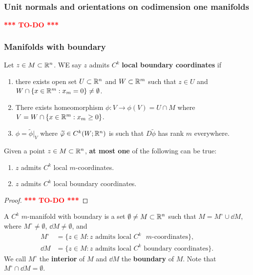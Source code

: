 \documentclass[a4paper]{article}
\newcommand{\TODO}{\textcolor{red}{\textbf{*** TO-DO ***}}}
\begin{document}
\subsubsection{Unit normals and orientations on codimension 
one manifolds} 

\TODO

\subsubsection{Manifolds with boundary}

\begin{defi}
Let $z \in M \subset \mathbb{R}^n$. WE say $z$ admits $C^k$ \textbf{local 
boundary coordinates} if 
\begin{enumerate}
\item there exists open set $U \subset \mathbb{R}^n$ and $W \subset
\mathbb{R}^m$ such that $z \in U$ and $W \cap \{x \in \mathbb{R}^m : x_m = 0\}
\neq \emptyset$.

\item There exists homeomorphism $\phi: V \to \phi(V) = U \cap M$
where $V = W \cap \{x \in \mathbb{R}^m: x_m \geq 0\}$. 

\item $\phi = \tilde{\phi} \vert_V$ where $\widetilde{\varphi} \in C^k 
(W; \mathbb{R}^n)$ is such that $D \tilde{\phi}$ has rank $m$ everywhere.
\end{enumerate}
\end{defi}

\begin{prop}
Given a point $z \in M \subset \mathbb{R}^n$, \textbf{at most one}
of the following can be true: 
\begin{enumerate}
\item $z$ admits $C^k$ local $m$-coordinates.
\item $z$ admits $C^k$ local boundary coordinates.
\end{enumerate}
\end{prop}

\begin{proof}
\TODO
\end{proof}

\begin{defi}
A $C^k$ $m$-manifold with boundary is a set $\emptyset \neq
M \subset \mathbb{R}^n$ such that $M = M^\circ \cup \dd M$, 
where $M^\circ \neq \emptyset$, $\dd M \neq \emptyset$, and 
\[
\begin{aligned}
M^\circ &= \{z \in M : \text{$z$ admits local 
$C^k$ $m$-coordinates}\}, \\
\dd M &= \{z \in M : \text{$z$ admits local $C^k$ boundary
coordinates}\}.
\end{aligned}
\]
We call $M^\circ$ the \textbf{interior} of $M$ and $\dd M$
the \textbf{boundary} of $M$. Note that $M^\circ \cap \dd M 
= \emptyset$.
\end{defi}
\end{document}
